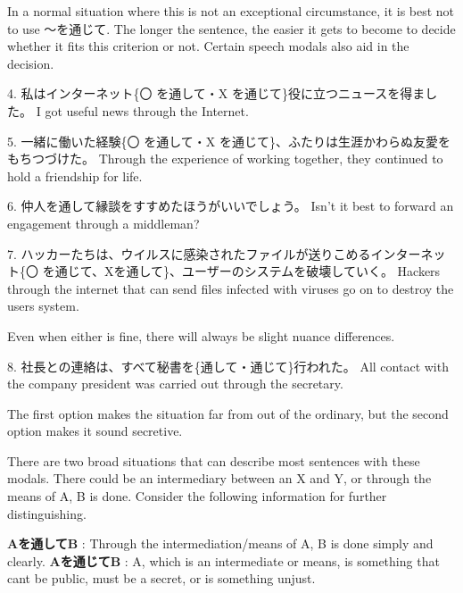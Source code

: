 \par{ In a normal situation where this is not an exceptional circumstance, it is best not to use ～を通じて. The longer the sentence, the easier it gets to become to decide whether it fits this criterion or not. Certain speech modals also aid in the decision. }

\par{4. 私はインターネット\{〇 を通して・X を通じて\}役に立つニュースを得ました。 \hfill\break
I got useful news through the Internet. }

\par{5. 一緒に働いた経験\{〇 を通して・X を通じて\}、ふたりは生涯かわらぬ友愛をもちつづけた。 \hfill\break
Through the experience of working together, they continued to hold a friendship for life. }

\par{6. 仲人を通して縁談をすすめたほうがいいでしょう。 \hfill\break
Isn't it best to forward an engagement through a middleman? }

\par{7. ハッカーたちは、ウイルスに感染されたファイルが送りこめるインターネット\{〇 を通じて、Xを通して\}、ユーザーのシステムを破壊していく。 \hfill\break
Hackers through the internet that can send files infected with viruses go on to destroy the user\textquotesingle s system. }

\par{ Even when either is fine, there will always be slight nuance differences. }

\par{8. 社長との連絡は、すべて秘書を\{通して・通じて\}行われた。 \hfill\break
All contact with the company president was carried out through the secretary. }

\par{ The first option makes the situation far from out of the ordinary, but the second option makes it sound secretive. }

\par{ There are two broad situations that can describe most sentences with these modals. There could be an intermediary between an X and Y, or through the means of A, B is done. Consider the following information for further distinguishing. }

\par{\textbf{Aを通してB }: Through the intermediation\slash means of A, B is done simply and clearly. \hfill\break
\textbf{Aを通じてB }: A, which is an intermediate or means, is something that can\textquotesingle t be public, must be a secret, or is something unjust. }

